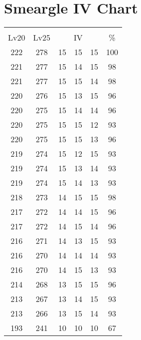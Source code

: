 \documentclass{article}%
\begin{document}
%
\normalsize%
\section{Smeargle IV Chart}%
\label{sec:Smeargle IV Chart}%
\renewcommand{\arraystretch}{1.5}%
\begin{tabular}{|c|c|c|c|c|c|}%
\hline%
\multicolumn{6}{|c|}{\textcolor{white}{ 
\linebreak{Smeargle}
}%
\cellcolor{black}}\\%
\multicolumn{1}{|c}{Lv20}&\multicolumn{1}{c|}{Lv25}&\multicolumn{3}{c|}{IV}&\multicolumn{1}{|c|}{\%}\\%
\hline%
\rowcolor{color100}%
222&278&15&15&15&100\\%
\hline%
\rowcolor{color98}%
221&277&15&14&15&98\\%
\hline%
\rowcolor{color98}%
221&277&15&15&14&98\\%
\hline%
\rowcolor{color96}%
220&276&15&13&15&96\\%
\hline%
\rowcolor{color96}%
220&275&15&14&14&96\\%
\hline%
\rowcolor{color93}%
220&275&15&15&12&93\\%
\hline%
\rowcolor{color96}%
220&275&15&15&13&96\\%
\hline%
\rowcolor{color93}%
219&274&15&12&15&93\\%
\hline%
\rowcolor{color93}%
219&274&15&13&14&93\\%
\hline%
\rowcolor{color93}%
219&274&15&14&13&93\\%
\hline%
\rowcolor{color98}%
218&273&14&15&15&98\\%
\hline%
\rowcolor{color96}%
217&272&14&14&15&96\\%
\hline%
\rowcolor{color96}%
217&272&14&15&14&96\\%
\hline%
\rowcolor{color93}%
216&271&14&13&15&93\\%
\hline%
\rowcolor{color93}%
216&270&14&14&14&93\\%
\hline%
\rowcolor{color93}%
216&270&14&15&13&93\\%
\hline%
\rowcolor{color96}%
214&268&13&15&15&96\\%
\hline%
\rowcolor{color93}%
213&267&13&14&15&93\\%
\hline%
\rowcolor{color93}%
213&266&13&15&14&93\\%
\hline%
\rowcolor{color91}%
193&241&10&10&10&67\\%
\end{tabular}

%
\end{document}
